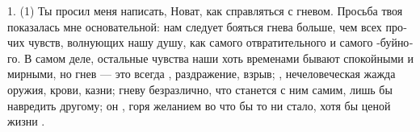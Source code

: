 1. (1) Ты про­сил меня напи­сать, Новат, как справ­лять­ся с гне­вом. Прось­ба твоя пока­за­лась мне осно­ва­тель­ной: нам сле­ду­ет боять­ся гне­ва боль­ше, чем всех про­чих чувств, вол­ну­ю­щих нашу душу, как само­го отвра­ти­тель­но­го и само­го -буй­но­го. В самом деле, осталь­ные чув­ства наши хоть вре­ме­на­ми быва­ют спо­кой­ны­ми и мир­ны­ми, но гнев --- это все­гда , раз­дра­же­ние, взрыв; , нече­ло­ве­че­ская жаж­да ору­жия, кро­ви, каз­ни; гне­ву без­раз­лич­но, что ста­нет­ся с ним самим, лишь бы навредить дру­го­му; он , горя жела­ни­ем  во что бы то ни ста­ло, хотя бы ценой жиз­ни .

